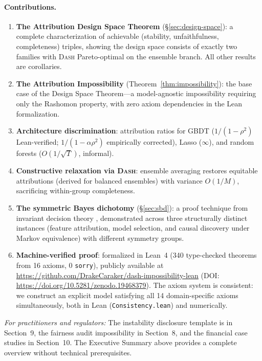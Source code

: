 \documentclass{article}
\newcommand{\DASH}{\textsc{Dash}}
\newcommand{\GBDT}{\textsc{GBDT}}
\begin{document}
\paragraph{Contributions.}
\begin{sloppypar}
\begin{enumerate}
    \item \textbf{The Attribution Design Space Theorem} (\S\ref{sec:design-space}):
    a complete characterization of achievable (stability, unfaithfulness, completeness)
    triples, showing the design space consists of exactly two families with \DASH{}
    Pareto-optimal on the ensemble branch. All other results are corollaries.
    \item \textbf{The Attribution Impossibility} (Theorem~\ref{thm:impossibility}):
    the base case of the Design Space Theorem---a model-agnostic impossibility
    requiring only the Rashomon property, with zero axiom dependencies in the Lean
    formalization.
    \item \textbf{Architecture discrimination}: attribution ratios for \GBDT{}
    ($1/(1{-}\rho^2)$ Lean-verified; $1/(1{-}\alpha\rho^2)$ empirically corrected),
    Lasso ($\infty$), and random forests ($O(1/\sqrt{T})$, informal).
    \item \textbf{Constructive relaxation via \DASH{}}: ensemble averaging restores
    equitable attributions (derived for balanced ensembles) with variance $O(1/M)$,
    sacrificing within-group completeness.
    \item \textbf{The symmetric Bayes dichotomy} (\S\ref{sec:sbd}): a proof technique
    from invariant decision theory \citep{lehmann2005testing}, demonstrated across three
    structurally distinct instances (feature attribution, model selection, and causal
    discovery under Markov equivalence) with different symmetry groups.
    \item \textbf{Machine-verified proof}: formalized in Lean~4 (340 type-checked theorems from 16 axioms, 0 \texttt{sorry}), publicly available at \url{https://github.com/DrakeCaraker/dash-impossibility-lean} (DOI: \url{https://doi.org/10.5281/zenodo.19468379}). The axiom system is consistent: we construct an explicit model satisfying all 14 domain-specific axioms simultaneously, both in Lean (\texttt{Consistency.lean}) and numerically.
\end{enumerate}
\end{sloppypar}

\noindent\textit{For practitioners and regulators:} The instability disclosure template is in Section~9, the fairness audit impossibility in Section~8, and the financial case studies in Section~10. The Executive Summary above provides a complete overview without technical prerequisites.
\end{document}
